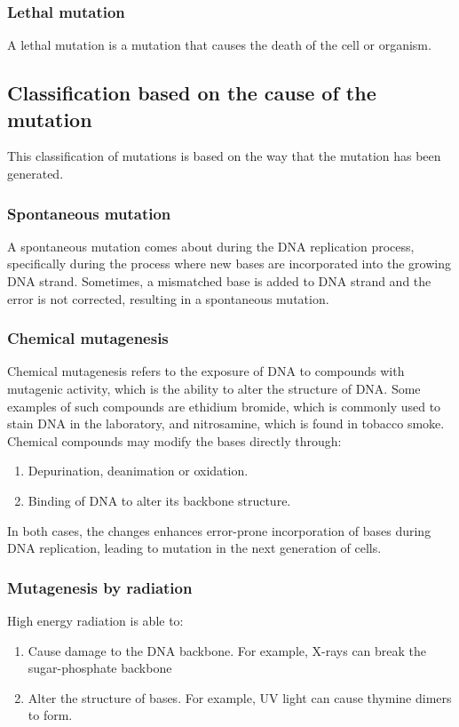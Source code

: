 \documentclass[11pt]{article}
\begin{document}
\subsubsection{Lethal mutation}
\label{sec:org7aa1506}
A lethal mutation is a mutation that causes the death of the cell or organism.

\newpage

\subsection{Classification based on the cause of the mutation}
\label{sec:org86c5dc5}
This classification of mutations is based on the way that the mutation has been generated.

\subsubsection{Spontaneous mutation}
\label{sec:org5962c8d}
A spontaneous mutation comes about during the DNA replication process, specifically during the process where new bases are incorporated into the growing DNA strand. Sometimes, a mismatched base is added to DNA strand and the error is not corrected, resulting in a spontaneous mutation.

\subsubsection{Chemical mutagenesis}
\label{sec:org113bbb4}
Chemical mutagenesis refers to the exposure of DNA to compounds with mutagenic activity, which is the ability to alter the structure of DNA. Some examples of such compounds are ethidium bromide, which is commonly used to stain DNA in the laboratory, and nitrosamine, which is found in tobacco smoke.
\\[0pt]

Chemical compounds may modify the bases directly through:
\begin{enumerate}
\item Depurination, deanimation or oxidation.
\item Binding of DNA to alter its backbone structure.
\end{enumerate}

In both cases, the changes enhances error-prone incorporation of bases during DNA replication, leading to mutation in the next generation of cells.

\newpage

\subsubsection{Mutagenesis by radiation}
\label{sec:orgccb9019}
High energy radiation is able to:
\begin{enumerate}
\item Cause damage to the DNA backbone. For example, X-rays can break the sugar-phosphate backbone
\item Alter the structure of bases. For example, UV light can cause thymine dimers to form.
\end{enumerate}
\end{document}
